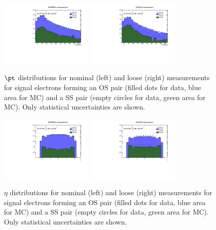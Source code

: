 \begin{figure}[!htb]
\centering
\includegraphics[width=0.4\textwidth]{FIGURES/BKG/chargeFlip/pt_nominal_v28.pdf}
\includegraphics[width=0.4\textwidth]{FIGURES/BKG/chargeFlip/pt_loose_v28.pdf}
\caption{\label{fig:ptsig} $\pt$ distributions for nominal (left) and loose (right) measurements for signal electrons forming an OS pair (filled dots for data, blue area for MC) and a SS pair (empty circles for data, green area for MC). Only statistical uncertainties are shown.}
\end{figure}

\begin{figure}[!htb]
\centering
\includegraphics[width=0.4\textwidth]{FIGURES/BKG/chargeFlip/eta_nominal_v28.pdf}
\includegraphics[width=0.4\textwidth]{FIGURES/BKG/chargeFlip/eta_loose_v28.pdf}
\caption{\label{fig:etasig} $\eta$ distributions for nominal (left) and loose (right) measurements for signal electrons forming an OS pair (filled dots for data, blue area for MC) and a SS pair (empty circles for data, green area for MC). Only statistical uncertainties are shown.}
\end{figure}


